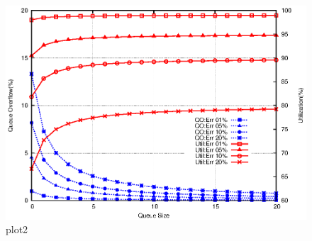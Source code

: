 \begin{figure}[ht]
\centering
  \includegraphics[scale =1]{plots/qsize-util-err}
\caption{plot2}
 \end{figure}
